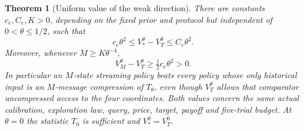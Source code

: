 \documentclass[11pt]{amsart}
\newtheorem{theorem}{Theorem}[section]
\theoremstyle{definition}\newtheorem{definition}[theorem]{Definition}
\theoremstyle{remark}\newtheorem{remark}[theorem]{Remark}
\begin{document}
\begin{theorem}[Uniform value of the weak direction]\label{thm:resolved-value}
There are constants $c_e,C_e,K>0$, depending on the fixed prior and
protocol but independent of $0<\theta\le1/2$, such that
\begin{equation}\label{eq:erasure-value}
 c_e\theta^2\le V_*^\theta-V_T^\theta\le C_e\theta^2.
\end{equation}
Moreover, whenever $M\ge K\theta^{-4}$,
\begin{equation}\label{eq:finite-state-advantage}
 V_M^\theta-V_T^\theta\ge\tfrac12c_e\theta^2>0.
\end{equation}
In particular an $M$-state streaming policy beats every policy whose only
historical input is an $M$-message compression of $T_\theta$, even though
$V_T^\theta$ allows that comparator uncompressed access to the four
coordinates. Both values concern the same actual calibration, exploration
law, query, price, target, payoff and five-trial budget. At $\theta=0$ the
statistic $T_0$ is sufficient and $V_*^0=V_T^0$.
\end{theorem}
\end{document}
